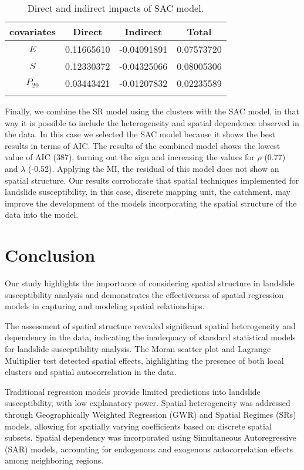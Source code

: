 \documentclass[
  manuscript=article,  
  layout=preprint,  
  year=2023,
  volume=0,
]{format}
\begin{document}
\begin{table}[htbp]\centering
\caption{Direct and indirect impacts of SAC model.}
\label{tab:impacts}
\begin{tabular}{c c c c}
\toprule
\textbf{covariates} & \textbf{Direct} & \textbf{Indirect} & \textbf{Total}\\ 
\midrule
$E$&0.11665610&-0.04091891 &0.07573720\\
$S$&0.12330372 &-0.04325066 &0.08005306\\
$P_{20}$&0.03443421 &-0.01207832 &0.02235589\\
\bottomrule
\addlinespace[1ex]
\end{tabular}
\end{table}

Finally, we combine the SR model using the clusters with the SAC model, in that way it is possible to include the heterogeneity and spatial dependence observed in the data. In this case we selected the SAC model because it shows the best results in terms of AIC. The results of the combined model shows the lowest value of AIC (387), turning out the sign and increasing the values for $\rho$ (0.77) and $\lambda$ (-0.52). Applying the MI, the residual of this model does not show an spatial structure. Our results corroborate that spatial techniques implemented for landslide susceptibility, in this case, discrete mapping unit, the catchment, may improve the development of the models incorporating the spatial structure of the data into the model.


\section{Conclusion}
\par Our study highlights the importance of considering spatial structure in landslide susceptibility analysis and demonstrates the effectiveness of spatial regression models in capturing and modeling spatial relationships. 

\par The assessment of spatial structure revealed significant spatial heterogeneity and dependency in the data, indicating the inadequacy of standard statistical models for landslide susceptibility analysis. The Moran scatter plot and Lagrange Multiplier test detected spatial effects, highlighting the presence of both local clusters and spatial autocorrelation in the data.

\par Traditional regression models provide limited predictions into landslide susceptibility, with low explanatory power. Spatial heterogeneity was addressed through Geographically Weighted Regression (GWR) and Spatial Regimes (SRs) models, allowing for spatially varying coefficients based on discrete spatial subsets. Spatial dependency was incorporated using Simultaneous Autoregressive (SAR) models, accounting for endogenous and exogenous autocorrelation effects among neighboring regions.
\end{document}
